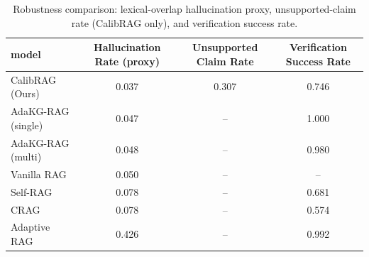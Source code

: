 \begin{table}
\caption{Robustness comparison: lexical-overlap hallucination proxy, unsupported-claim rate (CalibRAG only), and verification success rate.}
\label{tab:hallucination_analysis}
\begin{tabular}{lccc}
\toprule
model & Hallucination Rate (proxy) & Unsupported Claim Rate & Verification Success Rate \\
\midrule
CalibRAG (Ours) & 0.037 & 0.307 & 0.746 \\
AdaKG-RAG (single) & 0.047 & -- & 1.000 \\
AdaKG-RAG (multi) & 0.048 & -- & 0.980 \\
Vanilla RAG & 0.050 & -- & -- \\
Self-RAG & 0.078 & -- & 0.681 \\
CRAG & 0.078 & -- & 0.574 \\
Adaptive RAG & 0.426 & -- & 0.992 \\
\bottomrule
\end{tabular}
\end{table}

